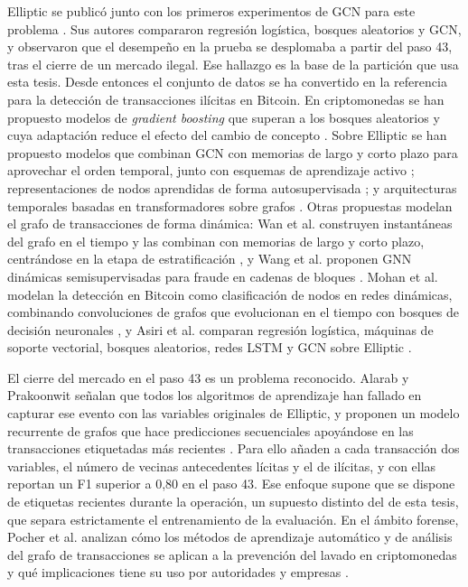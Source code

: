 Elliptic se publicó junto con los primeros experimentos de GCN para este problema
\cite{Weber2019Elliptic}. Sus autores compararon regresión logística, bosques aleatorios y GCN,
y observaron que el desempeño en la prueba se desplomaba a partir del paso 43, tras el cierre
de un mercado ilegal. Ese hallazgo es la base de la partición que usa esta tesis. Desde
entonces el conjunto de datos se ha convertido en la referencia para la detección de
transacciones ilícitas en Bitcoin. En criptomonedas se han propuesto modelos de \textit{gradient boosting} que superan a los bosques aleatorios y cuya adaptación reduce el efecto del cambio de concepto \cite{Vassallo2021Boosting}. Sobre Elliptic se han propuesto modelos que combinan GCN con memorias de largo y corto
plazo para aprovechar el orden temporal, junto con esquemas de aprendizaje activo
\cite{Alarab2023Graph}; representaciones de nodos aprendidas de forma autosupervisada
\cite{Lo2023Inspection}; y arquitecturas temporales basadas en transformadores sobre grafos
\cite{Lin2026Detecting}. Otras propuestas modelan el grafo de transacciones de forma dinámica: Wan et al. construyen instantáneas del grafo en el tiempo y las combinan con memorias de largo y corto plazo, centrándose en la etapa de estratificación \cite{Wan2024Memory}, y Wang et al. proponen GNN dinámicas semisupervisadas para fraude en cadenas de bloques \cite{Wang2025CoSemiGNN}. Mohan et al. modelan la detección en Bitcoin como clasificación de
nodos en redes dinámicas, combinando convoluciones de grafos que evolucionan en el tiempo con
bosques de decisión neuronales \cite{DTA2022Evolving}, y Asiri et al. comparan regresión
logística, máquinas de soporte vectorial, bosques aleatorios, redes LSTM y GCN sobre Elliptic
\cite{SciRep2025GCN}.

El cierre del mercado en el paso 43 es un problema reconocido. Alarab y Prakoonwit señalan que
todos los algoritmos de aprendizaje han fallado en capturar ese evento con las variables
originales de Elliptic, y proponen un modelo recurrente de grafos que hace predicciones
secuenciales apoyándose en las transacciones etiquetadas más recientes
\cite{Alarab2023Recurrent}. Para ello añaden a cada transacción dos variables, el número de
vecinas antecedentes lícitas y el de ilícitas, y con ellas reportan un F1 superior a 0,80 en el
paso 43. Ese enfoque supone que se dispone de etiquetas recientes durante la
operación, un supuesto distinto del de esta tesis, que separa estrictamente el entrenamiento de
la evaluación. En el ámbito forense,
Pocher et al. analizan cómo los métodos de aprendizaje automático y de análisis del grafo de
transacciones se aplican a la prevención del lavado en criptomonedas y qué implicaciones
tiene su uso por autoridades y empresas \cite{Pocher2023Anomalous}.

